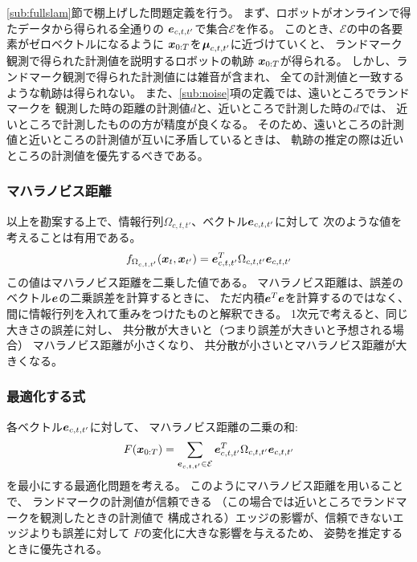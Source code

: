 \ref{sub:fullslam}節で棚上げした問題定義を行う。
まず、ロボットがオンラインで得たデータから得られる全通りの
$\boldsymbol{e}_{c,t,t'}$で集合$\mathcal{E}$を作る。
このとき、$\mathcal{E}$の中の各要素がゼロベクトルになるように
$\boldsymbol{x}_{0:T}$を$\boldsymbol{\mu}_{c,t,t'}$に近づけていくと、
ランドマーク観測で得られた計測値を説明するロボットの軌跡
$\boldsymbol{x}_{0:T}$が得られる。
しかし、ランドマーク観測で得られた計測値には雑音が含まれ、
全ての計測値と一致するような軌跡は得られない。
また、\ref{sub:noise}項の定義では、遠いところでランドマークを
観測した時の距離の計測値$d$と、近いところで計測した時の$d$では、
近いところで計測したものの方が精度が良くなる。
そのため、遠いところの計測値と近いところの計測値が互いに矛盾しているときは、
軌跡の推定の際は近いところの計測値を優先するべきである。

\subsubsection{マハラノビス距離}

以上を勘案する上で、情報行列$\Omega_{c,t,t'}$、ベクトル$\boldsymbol{e}_{c,t,t'}$に対して
次のような値を考えることは有用である。
\begin{align}
	f_{\Omega_{c,t,t'}}(\boldsymbol{x}_t,\boldsymbol{x}_{t'}) = \boldsymbol{e}_{c,t,t'}^T \Omega_{c,t,t'} \boldsymbol{e}_{c,t,t'}
\end{align}
この値はマハラノビス距離を二乗した値である。
マハラノビス距離は、誤差のベクトル$\boldsymbol{e}$の二乗誤差を計算するときに、
ただ内積$\boldsymbol{e}^T \boldsymbol{e}$を計算するのではなく、
間に情報行列を入れて重みをつけたものと解釈できる。
1次元で考えると、同じ大きさの誤差に対し、
共分散が大きいと（つまり誤差が大きいと予想される場合）
マハラノビス距離が小さくなり、
共分散が小さいとマハラノビス距離が大きくなる。

\subsubsection{最適化する式}

各ベクトル$\boldsymbol{e}_{c,t,t'}$に対して、
マハラノビス距離の二乗の和: 
\begin{align}
	F(\boldsymbol{x}_{0:T}) = \sum_{\boldsymbol{e}_{c,t,t'} \in \mathcal{E}} \boldsymbol{e}_{c,t,t'}^T \Omega_{c,t,t'} \boldsymbol{e}_{c,t,t'}
\end{align}
を最小にする最適化問題を考える。
このようにマハラノビス距離を用いることで、
ランドマークの計測値が信頼できる
（この場合では近いところでランドマークを観測したときの計測値で
構成される）エッジの影響が、信頼できないエッジよりも誤差に対して
$F$の変化に大きな影響を与えるため、
姿勢を推定するときに優先される。

